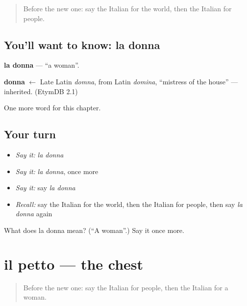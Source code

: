 \label{lesson:IT-C102-donna}



\begin{quote}
Before the new one: say the Italian for the world, then the Italian for people.
\end{quote}

\subsection*{You'll want to know: la donna}
\textbf{la donna} — \textquotedblleft{}a woman\textquotedblright{}.

\begin{cousinweb}
\textbf{donna} $\leftarrow$ Late Latin \emph{domna}, from Latin \emph{domina}, \textquotedblleft{}mistress of the house\textquotedblright{} — inherited. (EtymDB 2.1)
\end{cousinweb}

\begin{grammarlens}[title={What you've built}]
One more word for this chapter.
\end{grammarlens}

\subsection*{Your turn}
\begin{itemize}
\raggedright
  \item \emph{Say it:} \emph{la donna}
  \item \emph{Say it:} \emph{la donna}, once more
  \item \emph{Say it:} say \emph{la donna}
  \item \emph{Recall:} say the Italian for the world, then the Italian for people, then say \emph{la donna} again
\end{itemize}

\begin{tcolorbox}[breakable,colback=teal!4,colframe=teal!35!black,title={Before you move on}]
What does la donna mean? (\textquotedblleft{}A woman\textquotedblright{}.) Say it once more.
\end{tcolorbox}
\section[il petto]{il petto — the chest}

\label{lesson:IT-C102-petto}



\begin{quote}
Before the new one: say the Italian for people, then the Italian for a woman.
\end{quote}

